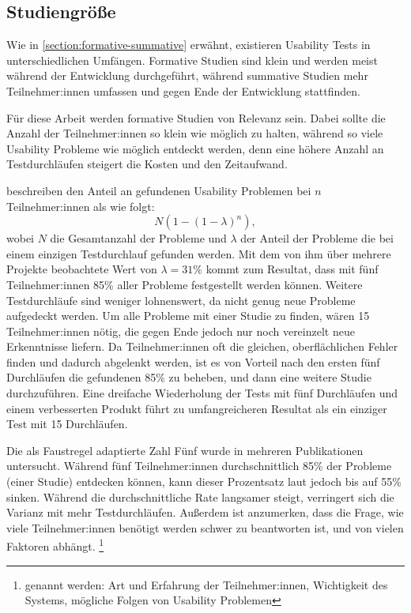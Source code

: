 \subsection{Studiengröße}
\label{section:study-size}

Wie in \ref{section:formative-summative} erwähnt, existieren Usability Tests in unterschiedlichen
Umfängen. Formative Studien sind klein und werden meist während der Entwicklung durchgeführt,
während summative Studien mehr Teilnehmer:innen umfassen und gegen Ende der Entwicklung stattfinden.

Für diese Arbeit werden formative Studien von Relevanz sein. Dabei sollte die Anzahl der
Teilnehmer:innen so klein wie möglich zu halten, während so viele Usability Probleme wie möglich
entdeckt werden, denn eine höhere Anzahl an Testdurchläufen steigert die Kosten und den Zeitaufwand.
\parencites{faulknerFiveuserAssumption2003, nielsenWhyYou2000}

\textcite{nielsenMathematicalModel1993} beschreiben den Anteil an gefundenen Usability Problemen bei
$n$ Teilnehmer:innen als wie folgt:
\begin{equation}
  \label{equation:finding-usability-problems}
  N(1-(1-\lambda{})^n),
\end{equation}
wobei $N$ die Gesamtanzahl der Probleme und $\lambda{}$ der Anteil der Probleme die bei einem
einzigen Testdurchlauf gefunden werden. Mit dem von ihm über mehrere Projekte beobachtete Wert von
$\lambda{}=31\%$ kommt \textcite{nielsenWhyYou2000} zum Resultat, dass mit fünf Teilnehmer:innen
85\% aller Probleme festgestellt werden können. \cite{nielsenWhyYou2000} Weitere Testdurchläufe sind
weniger lohnenswert, da nicht genug neue Probleme aufgedeckt werden. Um alle Probleme mit einer
Studie zu finden, wären 15 Teilnehmer:innen nötig, die gegen Ende jedoch nur noch vereinzelt neue
Erkenntnisse liefern. Da Teilnehmer:innen oft die gleichen, oberflächlichen Fehler finden und
dadurch abgelenkt werden, ist es von Vorteil nach den ersten fünf Durchläufen die gefundenen 85\% zu
beheben, und dann eine weitere Studie durchzuführen. Eine dreifache Wiederholung der Tests mit fünf
Durchläufen und einem verbesserten Produkt führt zu umfangreicheren Resultat als ein einziger Test
mit 15 Durchläufen.
\parencite{nielsenWhyYou2000}

Die als Faustregel adaptierte Zahl Fünf wurde in mehreren Publikationen untersucht. Während fünf
Teilnehmer:innen durchschnittlich 85\% der Probleme (einer Studie) entdecken können, kann dieser
Prozentsatz laut \textcite{faulknerFiveuserAssumption2003} jedoch bis auf 55\% sinken. Während die
durchschnittliche Rate langsamer steigt, verringert sich die Varianz mit mehr Testdurchläufen.
Außerdem ist anzumerken, dass die Frage, wie viele Teilnehmer:innen benötigt werden schwer zu
beantworten ist, und von vielen Faktoren abhängt. \footnote{genannt werden: Art und Erfahrung der
Teilnehmer:innen, Wichtigkeit des Systems, mögliche Folgen von Usability Problemen}
\parencite{faulknerFiveuserAssumption2003}


